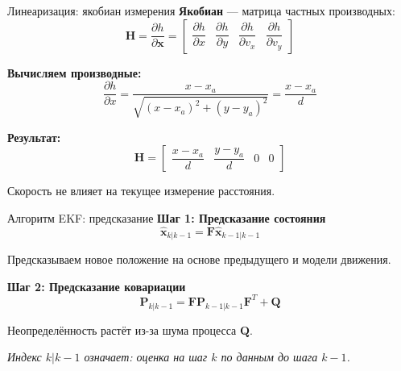 \documentclass[aspectratio=169, 12pt]{beamer}
\begin{document}

\begin{frame}{Линеаризация: якобиан измерения}
    \textbf{Якобиан} --- матрица частных производных:
    \[
    \mathbf{H} = \frac{\partial h}{\partial \mathbf{x}} = \begin{bmatrix} 
        \dfrac{\partial h}{\partial x} & 
        \dfrac{\partial h}{\partial y} & 
        \dfrac{\partial h}{\partial v_x} & 
        \dfrac{\partial h}{\partial v_y} 
    \end{bmatrix}
    \]
    
    \vspace{0.3cm}
    \textbf{Вычисляем производные:}
    \[
    \frac{\partial h}{\partial x} = \frac{x - x_a}{\sqrt{(x-x_a)^2 + (y-y_a)^2}} = \frac{x - x_a}{d}
    \]
    
    \vspace{0.3cm}
    \textbf{Результат:}
    \[
    \mathbf{H} = \begin{bmatrix} \dfrac{x - x_a}{d} & \dfrac{y - y_a}{d} & 0 & 0 \end{bmatrix}
    \]
    
    Скорость не влияет на текущее измерение расстояния.
\end{frame}

\begin{frame}{Алгоритм EKF: предсказание}
    \textbf{Шаг 1: Предсказание состояния}
    \[
    \hat{\mathbf{x}}_{k|k-1} = \mathbf{F} \hat{\mathbf{x}}_{k-1|k-1}
    \]
    
    Предсказываем новое положение на основе предыдущего и модели движения.
    
    \vspace{0.5cm}
    \textbf{Шаг 2: Предсказание ковариации}
    \[
    \mathbf{P}_{k|k-1} = \mathbf{F} \mathbf{P}_{k-1|k-1} \mathbf{F}^T + \mathbf{Q}
    \]
    
    Неопределённость растёт из-за шума процесса $\mathbf{Q}$.
    
    \vspace{0.5cm}
    \textit{Индекс $k|k-1$ означает: оценка на шаг $k$ по данным до шага $k-1$.}
\end{frame}
\end{document}
